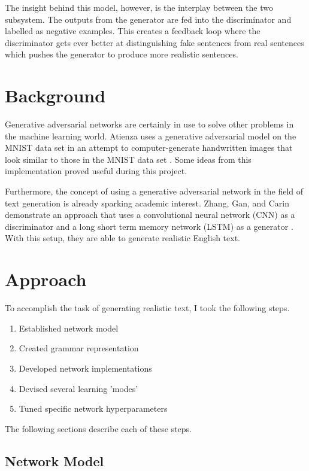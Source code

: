 \documentclass[11pt]{article}
\begin{document}
The insight behind this model, however, is the interplay between the two subsystem. The outputs from the generator are fed into the discriminator and labelled as negative examples. This creates a feedback loop where the discriminator gets ever better at distinguishing fake sentences from real sentences which pushes the generator to produce more realistic sentences.

\section{Background}

Generative adversarial networks are certainly in use to solve other problems in the machine learning world. Atienza uses a generative adversarial model on the MNIST data set in an attempt to computer-generate handwritten images that look similar to those in the MNIST data set \cite{gen_adv_example}. Some ideas from this implementation proved useful during this project.

Furthermore, the concept of using a generative adversarial network in the field of text generation is already sparking academic interest. Zhang, Gan, and Carin demonstrate an approach that uses a convolutional neural network (CNN) as a discriminator and a long short term memory network (LSTM) as a generator \cite{gan}. With this setup, they are able to generate realistic English text.

\section{Approach}

To accomplish the task of generating realistic text, I took the following steps.

\begin{enumerate}
    \item Established network model
    \item Created grammar representation
    \item Developed network implementations
    \item Devised several learning 'modes'
    \item Tuned specific network hyperparameters
\end{enumerate}

\noindent The following sections describe each of these steps.

\subsection{Network Model}
\end{document}
